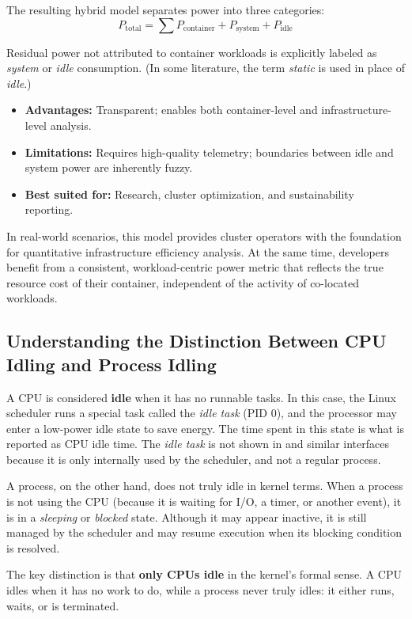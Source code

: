 The resulting hybrid model separates power into three categories:
\begin{equation}
    P_\text{total} = \sum P_\text{container} + P_\text{system} + P_\text{idle}
\end{equation}

Residual power not attributed to container workloads is explicitly labeled as \textit{system} or \textit{idle} consumption. (In some literature, the term \textit{static} is used in place of \textit{idle}.)

\begin{itemize}
    \item \textbf{Advantages:} Transparent; enables both container-level and infrastructure-level analysis.
    \item \textbf{Limitations:} Requires high-quality telemetry; boundaries between idle and system power are inherently fuzzy.
    \item \textbf{Best suited for:} Research, cluster optimization, and sustainability reporting.
\end{itemize}

In real-world scenarios, this model provides cluster operators with the foundation for quantitative infrastructure efficiency analysis. At the same time, developers benefit from a consistent, workload-centric power metric that reflects the true resource cost of their container, independent of the activity of co-located workloads.

\subsection{Understanding the Distinction Between CPU Idling and Process Idling}

A CPU is considered \textbf{idle} when it has no runnable tasks. In this case, the Linux scheduler runs a special task called the \textit{idle task} (PID 0), and the processor may enter a low-power idle state to save energy. The time spent in this state is what is reported as CPU idle time. The \textit{idle task} is not shown in  and similar interfaces because it is only internally used by the scheduler, and not a regular process.

A process, on the other hand, does not truly idle in kernel terms. When a process is not using the CPU (because it is waiting for I/O, a timer, or another event), it is in a \textit{sleeping} or \textit{blocked} state. Although it may appear inactive, it is still managed by the scheduler and may resume execution when its blocking condition is resolved.

The key distinction is that \textbf{only CPUs idle} in the kernel’s formal sense. A CPU idles when it has no work to do, while a process never truly idles: it either runs, waits, or is terminated.
